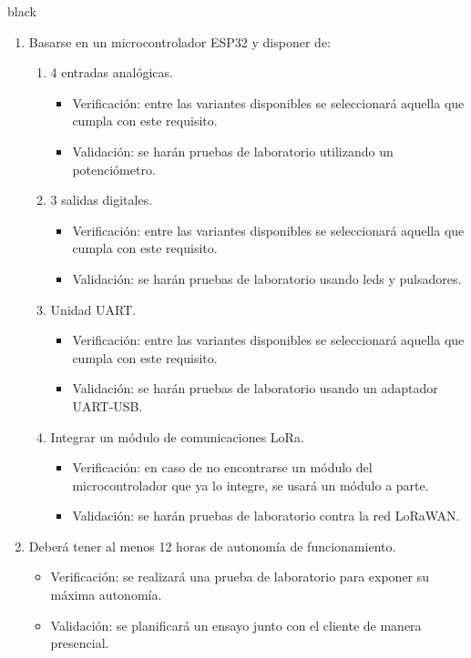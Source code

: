 \documentclass[11pt]{charter}
\begin{document}
\begin{consigna}{black}
\begin{enumerate}
\begin{enumerate}[label*=\arabic*.]
			\item Basarse en un microcontrolador ESP32 y disponer de:
			\begin{enumerate}[label*=\arabic*.]
				\item 4 entradas analógicas.
					\begin{itemize}
							\item Verificación: entre las variantes disponibles se seleccionará aquella que cumpla con este requisito.\\
							\item Validación: se harán pruebas de laboratorio utilizando un potenciómetro.\\
					\end{itemize}
				\item 3 salidas digitales.
					\begin{itemize}
						\item Verificación: entre las variantes disponibles se seleccionará aquella que cumpla con este requisito.\\
						\item Validación: se harán pruebas de laboratorio usando leds y pulsadores.\\
					\end{itemize}
				\item Unidad UART.
					\begin{itemize}
						\item Verificación: entre las variantes disponibles se seleccionará aquella que cumpla con este requisito.\\
						\item Validación: se harán pruebas de laboratorio usando un adaptador UART-USB.\\
					\end{itemize}
				\item Integrar un módulo de comunicaciones LoRa.
					\begin{itemize}
						\item Verificación: en caso de no encontrarse un módulo del microcontrolador que ya lo integre, se usará un módulo a parte.\\
						\item Validación: se harán pruebas de laboratorio contra la red LoRaWAN.\\
					\end{itemize}
			\end{enumerate}
			
			\item Deberá tener al menos 12 horas de autonomía de funcionamiento.
				\begin{itemize}
					\item Verificación: se realizará una prueba de laboratorio para exponer su máxima autonomía.\\
					\item Validación: se planificará un ensayo junto con el cliente de manera presencial.\\
				\end{itemize}
			

\end{enumerate}
\end{enumerate}
\end{consigna}
\end{document}
